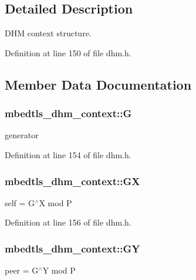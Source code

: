 \subsection{Detailed Description}
D\-H\-M context structure. 

Definition at line 150 of file dhm.\-h.



\subsection{Member Data Documentation}
\hypertarget{structmbedtls__dhm__context_a4fa0b65bab8ce280ffab2df4285b7ee1}{
\subsubsection[{G}]{ mbedtls\-\_\-dhm\-\_\-context\-::\-G}}\label{structmbedtls__dhm__context_a4fa0b65bab8ce280ffab2df4285b7ee1}
generator 

Definition at line 154 of file dhm.\-h.

\hypertarget{structmbedtls__dhm__context_ac33a9d76870e8a807e1d0d9bf77fe85e}{
\subsubsection[{G\-X}]{ mbedtls\-\_\-dhm\-\_\-context\-::\-G\-X}}\label{structmbedtls__dhm__context_ac33a9d76870e8a807e1d0d9bf77fe85e}
self = G$^\wedge$\-X mod P 

Definition at line 156 of file dhm.\-h.

\hypertarget{structmbedtls__dhm__context_a834d14fb13ba02b1d604c306d0792bca}{
\subsubsection[{G\-Y}]{ mbedtls\-\_\-dhm\-\_\-context\-::\-G\-Y}}\label{structmbedtls__dhm__context_a834d14fb13ba02b1d604c306d0792bca}
peer = G$^\wedge$\-Y mod P 

